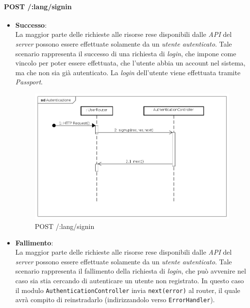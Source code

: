 \paragraph{POST /:lang/signin}
\begin{itemize}
\item \textbf{Successo}:\\
La maggior parte delle richieste alle risorse rese disponibili dalle \textit{API} del \textit{server} possono essere effettuate solamente da un \textit{utente autenticato}. Tale scenario rappresenta il successo di una richiesta di \textit{login}, che impone come vincolo per poter essere effettuata, che l'utente abbia un account nel sistema, ma che non sia già autenticato. La \textit{login} dell'utente viene effettuata tramite \textit{Passport}.

\label{Procedura di autenticazione}
\begin{figure}[ht]
	\centering
	\includegraphics[scale=0.40]{UML/DiagrammiDiSequenza/Back-end/POST__lang_signin_success.png}
	\caption{POST /:lang/signin}
\end{figure}
\FloatBarrier
 
\item \textbf{Fallimento}:\\
La maggior parte delle richieste alle risorse rese disponibili dalle \textit{API} del \textit{server} possono essere effettuate solamente da un \textit{utente autenticato}. Tale scenario rappresenta il fallimento della richiesta di \textit{login}, che può avvenire nel caso sia stia cercando di autenticare un utente non registrato. In questo caso il modulo \texttt{AuthenticationController} invia \texttt{next(error)} al router, il quale avrà compito di reinstradarlo (indirizzandolo verso \texttt{ErrorHandler}).


\end{itemize}
